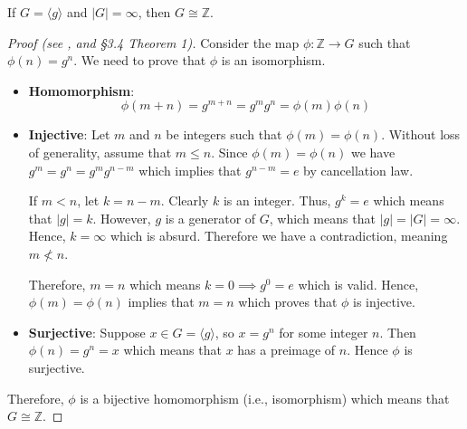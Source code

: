 \begin{theorem}
    If $G = \langle g \rangle$ and $|G| = \infty$, then $G \cong \mathbb{Z}$.
\end{theorem}
\begin{proof}[Proof (see \cite{proofwiki_infinitecyclicgrp}, and \cite{cohn_1982} \S 3.4 Theorem 1)]
    Consider the map $\phi: \mathbb{Z} \to G$ such that $\phi(n) = g^n$. We need to prove that $\phi$ is an isomorphism.
    \begin{itemize}
        \item \textbf{Homomorphism}:
        \[
            \phi(m+n) = g^{m+n} = g^mg^n = \phi(m)\phi(n)
        \]
        \item \textbf{Injective}: Let $m$ and $n$ be integers such that $\phi(m) = \phi(n)$. Without loss of generality, assume that $m \leq n$. Since $\phi(m) = \phi(n)$ we have $g^m = g^n = g^mg^{n-m}$ which implies that $g^{n-m} = e$ by cancellation law.

        If $m < n$, let $k = n - m$. Clearly $k$ is an integer. Thus, $g^k = e$ which means that $|g| = k$. However, $g$ is a generator of $G$, which means that $|g| = |G| = \infty$. Hence, $k = \infty$ which is absurd. Therefore we have a contradiction, meaning $m \not< n$.

        Therefore, $m = n$ which means $k = 0 \implies g^0 = e$ which is valid. Hence, $\phi(m) = \phi(n)$ implies that $m = n$ which proves that $\phi$ is injective.
        \item \textbf{Surjective}: Suppose $x \in G = \langle g\rangle$, so $x = g^n$ for some integer $n$. Then $\phi(n) = g^n = x$ which means that $x$ has a preimage of $n$. Hence $\phi$ is surjective.
    \end{itemize}

    Therefore, $\phi$ is a bijective homomorphism (i.e., isomorphism) which means that $G \cong \mathbb{Z}$.
\end{proof}

\newpage


